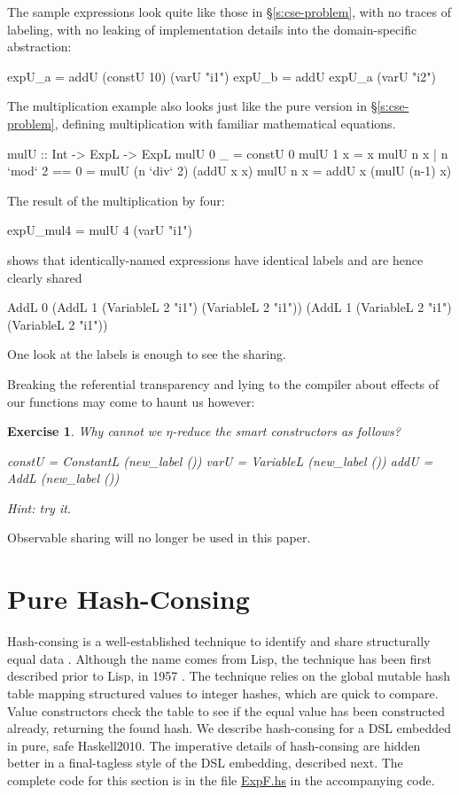 \documentclass[submission,copyright,creativecommons]{eptcs}
\newtheorem{Exercise}{Exercise} \newcommand\aside[1]{}
\begin{document}
The sample expressions look quite like those in \S\ref{s:cse-problem},
with no traces of labeling, with no leaking of implementation details
into the domain-specific abstraction:
\begin{code}
expU_a = addU (constU 10) (varU "i1")
expU_b = addU expU_a (varU "i2")
\end{code}

The multiplication example also looks just like the pure version in
\S\ref{s:cse-problem}, defining multiplication with familiar
mathematical equations.
\begin{code}
mulU :: Int -> ExpL -> ExpL
mulU 0 _ = constU 0
mulU 1 x = x
mulU n x | n `mod` 2 == 0 = mulU (n `div` 2) (addU x x)
mulU n x = addU x (mulU (n-1) x)
\end{code}
The result of the multiplication by four:
\begin{code}
expU_mul4 = mulU 4 (varU "i1")
\end{code}
shows that identically-named expressions have identical labels and are
hence clearly shared
\begin{code}
AddL 0 (AddL 1 (VariableL 2 "i1") (VariableL 2 "i1")) 
       (AddL 1 (VariableL 2 "i1") (VariableL 2 "i1"))
\end{code}
One look at the labels is enough to see the sharing.

Breaking the referential transparency and lying to the compiler about
effects of our functions may come to haunt us however:
\begin{Exercise}
Why cannot we $\eta$-reduce the smart constructors as follows?
\begin{code}
constU = ConstantL (new_label ())
varU   = VariableL (new_label ())
addU   = AddL (new_label ())
\end{code}
Hint: try it.
\end{Exercise}
Observable sharing will no longer be used in this paper.

\section{Pure Hash-Consing}
\label{s:hash-cons}

Hash-consing is a well-established technique to identify and share
structurally equal data \cite{filliatre-type-safe}. Although the name
comes from Lisp, the technique has been first described prior to Lisp,
in 1957 \cite{Ershov-hash-consing}. The
technique relies on the global mutable hash table mapping structured
values to integer hashes, which are quick to compare. Value
constructors check the table to see if the equal value has been
constructed already, returning the found hash. We describe
hash-consing for a DSL embedded in pure, safe Haskell2010. The
imperative details of hash-consing are hidden better in a
final-tagless style of the DSL embedding, described next.  The
complete code for this section is in the file \url{ExpF.hs} in the
accompanying code.
\end{document}
